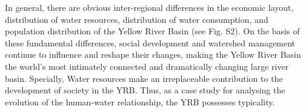 \documentclass[9pt,twoside,lineno]{pnas-new}
\begin{document}
In general, there are obvious inter-regional differences in the economic layout, distribution of water resources, distribution of water consumption, and population distribution of the Yellow River Basin (see Fig. S2). 
On the basis of these fundamental differences, social development and watershed management continue to influence and reshape their changes, making the Yellow River Basin the world's most intimately connected and dramatically changing large river basin. 
Specially, Water resources make an irreplaceable contribution to the development of society in the YRB. 
Thus, as a case study for analysing the evolution of the human-water relationship, the YRB possesses typicality.


\end{document}

